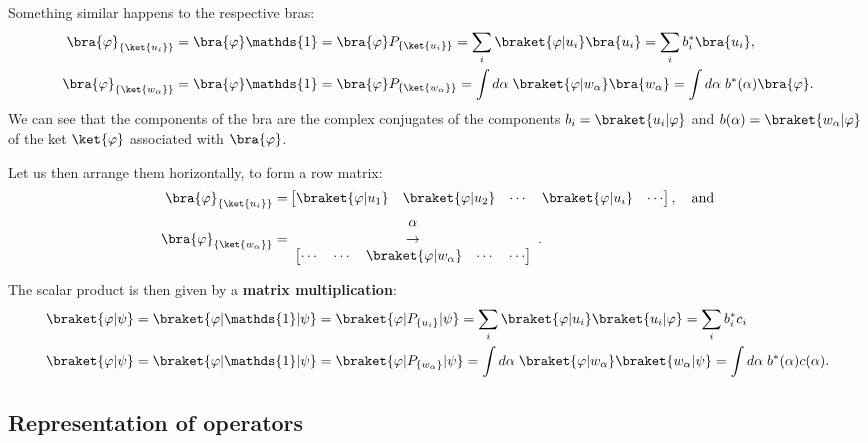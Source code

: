Something similar happens to the respective bras:
\begin{align*}
    \bra{\varphi}_{\{\ket{u_i}\}}&=\bra{\varphi}\mathds{1}=\bra{\varphi}P_{\{\ket{u_i}\}}=\sum_i\braket{\varphi|u_i}\bra{u_i}=\sum_ib^*_i\bra{u_i},\\
    \bra{\varphi}_{\{\ket{w_\alpha}\}}&=\bra{\varphi}\mathds{1}=\bra{\varphi}P_{\{\ket{w_\alpha}\}}=\int d\alpha\;\braket{\varphi|w_\alpha}\bra{w_\alpha}=\int d\alpha\;b^*(\alpha)\bra{\varphi}.
\end{align*}
We can see that the components of the bra are the complex conjugates of the components $b_i=\braket{u_i|\varphi}$ and $b(\alpha)=\braket{w_\alpha|\varphi}$ of the ket $\ket{\varphi}$ associated with $\bra{\varphi}$.

Let us then arrange them horizontally, to form a row matrix:
\begin{align}
    \bra{\varphi}_{\{\ket{u_i}\}}=&\begin{bmatrix}
        \braket{\varphi|u_1}&\braket{\varphi|u_2}&
        \cdots&\braket{\varphi|u_i}&\cdots
    \end{bmatrix},\quad\text{and}\\
    \bra{\varphi}_{\{\ket{w_\alpha}\}}=&
    \begin{array}{c}
    \alpha\\\rightarrow\\
    \begin{bmatrix}
        \cdots&\cdots&\braket{\varphi|w_\alpha}&\cdots&\cdots
    \end{bmatrix}
    \end{array}.
\end{align}

The scalar product is then given by a \textbf{matrix multiplication}:
\begin{align}
    \braket{\varphi|\psi}&=\braket{\varphi|\mathds{1}|\psi}=\braket{\varphi|P_{\{u_i\}}|\psi}=\sum_i\braket{\varphi|u_i}\braket{u_i|\varphi}=\sum_ib_i^*c_i\\
    \braket{\varphi|\psi}&=\braket{\varphi|\mathds{1}|\psi}=\braket{\varphi|P_{\{w_\alpha\}}|\psi}=\int d\alpha\;\braket{\varphi|w_\alpha}\braket{w_\alpha|\psi}=\int d\alpha\;b^*(\alpha)c(\alpha).
\end{align}

\subsection{Representation of operators}
